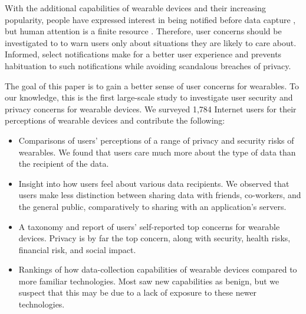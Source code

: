 With the additional capabilities of wearable devices and their increasing popularity, people have expressed interest in being notified before data capture \cite{denning2014situ}, but human attention is a finite resource \cite{bohme2011security}. Therefore, user concerns should be investigated to to warn users only about situations they are likely to care about. Informed, select notifications make for a better user experience and prevents habituation to such notifications while avoiding scandalous breaches of privacy.

The goal of this paper is to gain a better sense of user concerns for wearables. To our knowledge, this is the first large-scale study to investigate user security and privacy concerns for wearable devices. We surveyed 1,784 Internet users for their perceptions of wearable devices and contribute the following: \\[-0.8cm]

\begin{itemize} \itemsep1pt \parskip0pt 
\item Comparisons of users' perceptions of a range of privacy and security risks of wearables. We found that users care much more about the type of data than the recipient of the data.
\item Insight into how users feel about various data recipients. We observed that users make less distinction between sharing data with friends, co-workers, and the general public, comparatively to sharing with an application's servers.
\item A taxonomy and report of users' self-reported top concerns for wearable devices. Privacy is by far the top concern, along with security, health risks, financial risk, and social impact. 
\item Rankings of how data-collection capabilities of wearable devices compared to more familiar technologies.  Most saw new capabilities as benign, but we suspect that this may be due to a lack of exposure to these newer technologies.
\end{itemize}
